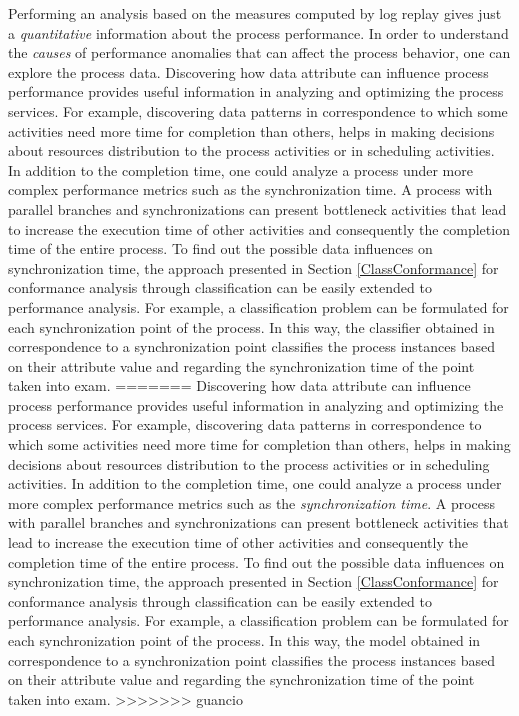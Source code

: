 \documentclass{llncs}
\begin{document}
Performing an analysis based on the measures computed by log replay gives just a \emph{quantitative} information about the process performance. In order to understand the \emph{causes} of performance anomalies that can affect the process behavior, one can explore the process data. Discovering how data attribute can influence process performance provides useful information in analyzing and optimizing the process services. For example, discovering data patterns in correspondence to which some activities need more time for completion than others, helps in making decisions about resources distribution to the process activities or in scheduling activities. In addition to the completion time, one could analyze a process under more complex performance metrics such as the synchronization time. A process with parallel branches and synchronizations can present bottleneck activities that lead to increase the execution time of other activities and consequently the completion time of the entire process. To find out the possible data influences on synchronization time, the approach presented in Section \ref{ClassConformance} for conformance analysis through classification can be easily extended to performance analysis. For example, a classification problem can be formulated for each synchronization point of the process. In this way, the classifier obtained in correspondence to a synchronization point classifies the process instances based on their attribute value and regarding the synchronization time of the point taken into exam. 
=======
Discovering how data attribute can influence process performance provides useful information in analyzing and optimizing the process services. For example, discovering data patterns in correspondence to which some activities need more time for completion than others, helps in making decisions about resources distribution to the process activities or in scheduling activities. In addition to the completion time, one could analyze a process under more complex performance metrics such as the \emph{synchronization time}. A process with parallel branches and synchronizations can present bottleneck activities that lead to increase the execution time of other activities and consequently the completion time of the entire process. To find out the possible data influences on synchronization time, the approach presented in Section \ref{ClassConformance} for conformance analysis through classification can be easily extended to performance analysis. For example, a classification problem can be formulated for each synchronization point of the process. In this way, the model obtained in correspondence to a synchronization point classifies the process instances based on their attribute value and regarding the synchronization time of the point taken into exam. 
>>>>>>> guancio
\end{document}

